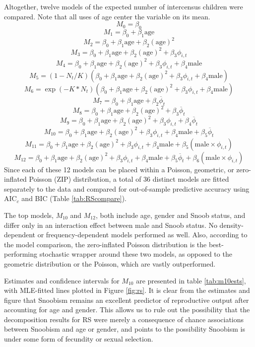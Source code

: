Altogether, twelve models of the expected number of intercensus children were compared.  Note that all uses of age center the variable on its mean.
	\[M_0 = \beta_0
\]
	\[M_1 = \beta_0 + \beta_1 \mathrm{age}
\]
	\[M_2 = \beta_0 + \beta_1 \mathrm{age} + \beta_2 \mathrm{(age)}^2
\]
	\[M_3 = \beta_0 + \beta_1 \mathrm{age} + \beta_2 \mathrm{(age)}^2 + \beta_3 \phi_{i,t}
\]
	\[M_4 = \beta_0 + \beta_1 \mathrm{age} + \beta_2 \mathrm{(age)}^2 + \beta_3 \phi_{i,t} + \beta_4 \mathrm{male}
\]
	\[M_5 = (1-N_t/K)(\beta_0 + \beta_1 \mathrm{age} + \beta_2 \mathrm{(age)}^2 + \beta_3 \phi_{i,t} + \beta_4 \mathrm{male})
\]
	\[M_6 = \exp(-K*N_t)(\beta_0 + \beta_1 \mathrm{age} + \beta_2 \mathrm{(age)}^2 + \beta_3 \phi_{i,t} + \beta_4 \mathrm{male})
\]
	\[M_7 = \beta_0 + \beta_1 \mathrm{age} + \beta_2 \overline{\phi}_t
\]
	\[M_8 = \beta_0 + \beta_1 \mathrm{age} + \beta_2 \mathrm{(age)}^2 + \beta_3 \overline{\phi}_t
\]
	\[M_9 = \beta_0 + \beta_1 \mathrm{age} + \beta_2 \mathrm{(age)}^2 + \beta_3 \phi_{i,t} + \beta_4 \overline{\phi}_t
\]
	\[M_{10} = \beta_0 + \beta_1 \mathrm{age} + \beta_2 \mathrm{(age)}^2 + \beta_3 \phi_{i,t} + \beta_4 \mathrm{male} + \beta_5 \overline{\phi}_t
\]
	\[M_{11} = \beta_0 + \beta_1 \mathrm{age} + \beta_2 \mathrm{(age)}^2 + \beta_3 \phi_{i,t} + \beta_4 \mathrm{male} + \beta_5 (\mathrm{male} \times \phi_{i,t})
\]
	\[M_{12} = \beta_0 + \beta_1 \mathrm{age} + \beta_2 \mathrm{(age)}^2 + \beta_3 \phi_{i,t} + \beta_4 \mathrm{male} + \beta_5 \overline{\phi}_t + \beta_6 (\mathrm{male} \times \phi_{i,t})
\]
Since each of these 12 models can be placed within a Poisson, geometric, or zero-inflated Poisson (ZIP) distribution, a total of 36 distinct models are fitted separately to the data and compared for out-of-sample predictive accuracy using AIC$_c$ and BIC (Table \ref{tab:RScompare}).

The top models, $M_{10}$ and $M_{12}$, both include age, gender and Snoob status, and differ only in an interaction effect between male and Snoob status.  No density-dependent or frequency-dependent models performed as well.  Also, according to the model comparison, the zero-inflated Poisson distribution is the best-performing stochastic wrapper around these two models, as opposed to the geometric distribution or the Poisson, which are vastly outperformed.

Estimates and confidence intervals for $M_{10}$ are presented in table \ref{tab:m10ests}, with MLE-fitted lines plotted in Figure \ref{fig:rs}.  It is clear from the estimates and figure that Snoobism remains an excellent predictor of reproductive output after accounting for age and gender.  This allows us to rule out the possibility that the decomposition results for RS were merely a consequence of chance associations between Snoobism and age or gender, and points to the possibility Snoobism is under some form of fecundity or sexual selection.    

